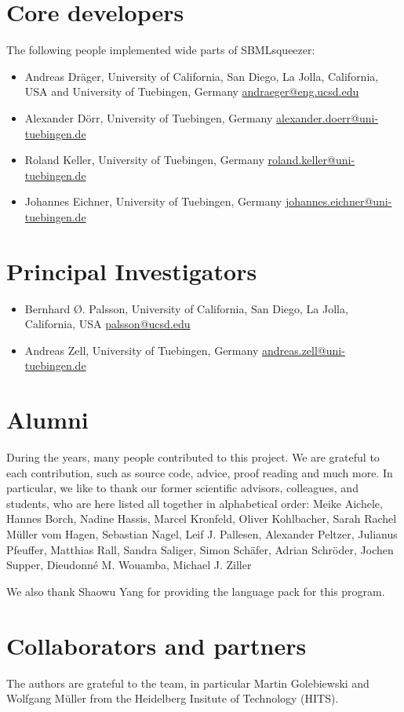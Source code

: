 \section{Core developers}

The following people implemented wide parts of SBMLsqueezer:
\begin{itemize}
\item Andreas Dr\"ager, 
  University of California, San Diego, La Jolla, California, USA and
  University of Tuebingen, Germany
  \href{mailto:andraeger@eng.ucsd.edu}{andraeger@eng.ucsd.edu}
\item Alexander D\"orr,
  University of Tuebingen, Germany
  \href{mailto:alexander.doerr@uni-tuebingen.de}{alexander.doerr@uni-tuebingen.de}
\item Roland Keller,
  University of Tuebingen, Germany
  \href{mailto:roland.keller@uni-tuebingen.de}{roland.keller@uni-tuebingen.de}
\item Johannes Eichner,
  University of Tuebingen, Germany
  \href{mailto:johannes.eichner@uni-tuebingen.de}{johannes.eichner@uni-tuebingen.de}
\end{itemize}

\section{Principal Investigators}

\begin{itemize}
\item Bernhard \O. Palsson,
  University of California, San Diego, La Jolla, California, USA
  \href{mailto:palsson@ucsd.edu}{palsson@ucsd.edu}
\item Andreas Zell, 
  University of Tuebingen, Germany
  \href{mailto:andreas.zell@uni-tuebingen.de}{andreas.zell@uni-tuebingen.de}
\end{itemize}

\section{Alumni}

During the years, many people contributed to this project.
We are grateful to each contribution, such as source code, advice, proof reading
and much more. In particular, we like to thank our former scientific advisors,
colleagues, and students, who are here listed all together in alphabetical
order:
Meike Aichele,
Hannes Borch,
Nadine Hassis,
Marcel Kronfeld,
Oliver Kohlbacher,
Sarah Rachel M\"uller vom Hagen,
Sebastian Nagel,
Leif J. Pallesen,
Alexander Peltzer,
Julianus Pfeuffer,
Matthias Rall,
Sandra Saliger,
Simon Sch\"afer,
Adrian Schr\"oder,
Jochen Supper,
Dieudonn\'e M. Wouamba,
Michael J. Ziller

We also thank Shaowu Yang for providing the \Chinese language pack for this program.

\section{Collaborators and partners}

The authors are grateful to the \SABIO team, in particular Martin Golebiewski and Wolfgang M\"uller from the Heidelberg Insitute of Technology (HITS).
